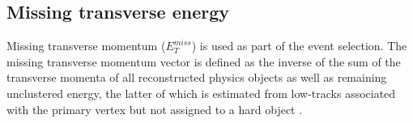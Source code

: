 \subsection{Missing transverse energy}
\label{subsec:met}

Missing transverse momentum ($E_T^{miss}$) is used as part of the event selection. The missing transverse momentum vector is defined as the inverse of the sum of the transverse momenta of all reconstructed physics objects as well as remaining unclustered energy, the latter of which is estimated from low-\pt tracks associated with the primary vertex but not assigned to a hard object \cite{ATL-PHYS-PUB-2015-027}. 

